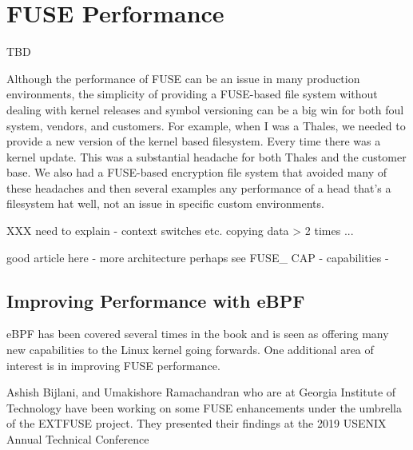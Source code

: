 
\section{FUSE Performance}

TBD

Although the performance of FUSE can be an issue in many production environments, the simplicity of providing a FUSE-based file system without dealing with kernel releases and symbol versioning can be a big win for both foul system, vendors, and customers. For example, when I was a Thales, we needed to provide a new version of the kernel based filesystem. Every time there was a kernel update. This was a substantial headache for both Thales and the customer base. We also had a FUSE-based encryption file system that avoided many of these headaches and then several examples any performance of a head that's a filesystem hat well, not an issue in specific custom environments.


XXX need to explain - context switches etc. copying data > 2 times ...

good article here - %
more architecture perhaps %
see FUSE\_ CAP - capabilities - %


\subsection{Improving Performance with eBPF}\label{fuse-ebpf}

eBPF has been covered several times in the book and is seen as offering many new capabilities to the Linux kernel going forwards. One additional area of interest is in improving FUSE performance. 

Ashish Bijlani, and Umakishore Ramachandran who are at Georgia Institute of Technology have been working on some FUSE enhancements under the umbrella of the EXTFUSE project. They presented their findings at the 2019 USENIX Annual Technical Conference

